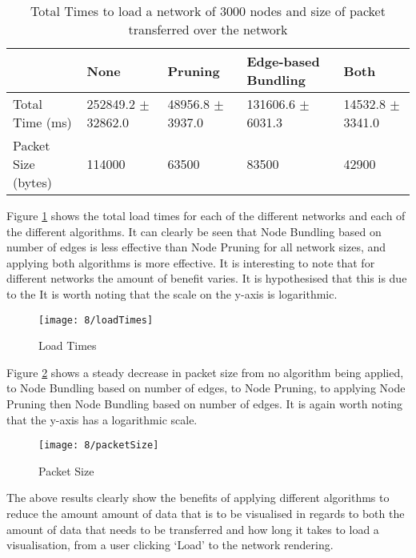 \documentclass[../dissertation.tex]{subfiles}
\begin{document}
\begin{table}[H]
\centering
\begin{tabular}{|l|l|l|l|l|}
\hline
                    & \textbf{None}          & \textbf{Pruning}     & \textbf{Edge-based Bundling}         & \textbf{Both}        \\ \hline
Total Time (ms)     & 252849.2 $\pm$ 32862.0 & 48956.8 $\pm$ 3937.0 & 131606.6 $\pm$ 6031.3 & 14532.8 $\pm$ 3341.0 \\ \hline
Packet Size (bytes) & 114000                 & 63500                & 83500                 & 42900                \\ \hline
\end{tabular}
\caption{Total Times to load a network of 3000 nodes and size of packet transferred over the network}
\label{table:3000-nodes}
\end{table}

Figure \ref{fig:loadTimes} shows the total load times for each of the different networks and each of the different algorithms. It can clearly be seen that Node Bundling based on number of edges is less effective than Node Pruning for all network sizes, and applying both algorithms is more effective. It is interesting to note that for different networks the amount of benefit varies. It is hypothesised that this is due to the  It is worth noting that the scale on the y-axis is logarithmic.

\begin{figure}[H]
    \centering
    \texttt{[image: 8/loadTimes]}
    \caption{Load Times}
    \label{fig:loadTimes}
\end{figure}

Figure \ref{fig:packetSize} shows a steady decrease in packet size from no algorithm being applied, to Node Bundling based on number of edges, to Node Pruning, to applying Node Pruning then Node Bundling based on number of edges. It is again worth noting that the y-axis has a logarithmic scale.

\begin{figure}[H]
    \centering
    \texttt{[image: 8/packetSize]}
    \caption{Packet Size}
    \label{fig:packetSize}
\end{figure}

The above results clearly show the benefits of applying different algorithms to reduce the amount amount of data that is to be visualised in regards to both the amount of data that needs to be transferred and how long it takes to load a visualisation, from a user clicking `Load' to the network rendering. 
\end{document}
